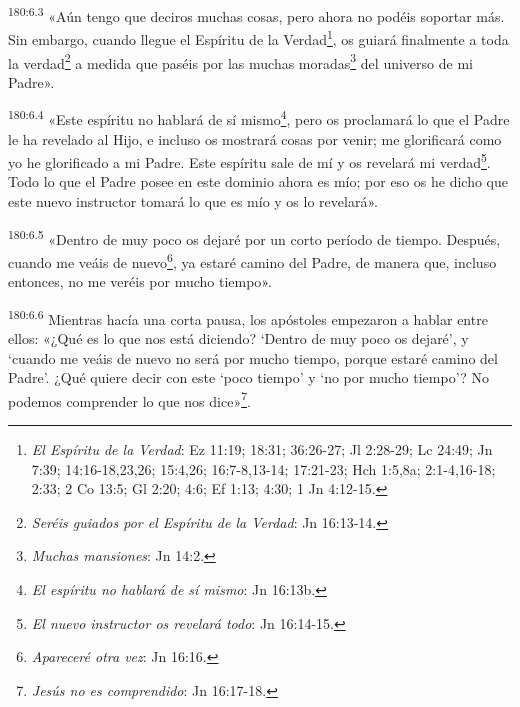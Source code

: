 \par
\textsuperscript{180:6.3} «Aún tengo que deciros muchas cosas, pero ahora no podéis soportar más. Sin embargo, cuando llegue el Espíritu de la Verdad\footnote{\textit{El Espíritu de la Verdad}: Ez 11:19; 18:31; 36:26-27; Jl 2:28-29; Lc 24:49; Jn 7:39; 14:16-18,23,26; 15:4,26; 16:7-8,13-14; 17:21-23; Hch 1:5,8a; 2:1-4,16-18; 2:33; 2 Co 13:5; Gl 2:20; 4:6; Ef 1:13; 4:30; 1 Jn 4:12-15.}, os guiará finalmente a toda la verdad\footnote{\textit{Seréis guiados por el Espíritu de la Verdad}: Jn 16:13-14.} a medida que paséis por las muchas moradas\footnote{\textit{Muchas mansiones}: Jn 14:2.} del universo de mi Padre».

\par
\textsuperscript{180:6.4} «Este espíritu no hablará de sí mismo\footnote{\textit{El espíritu no hablará de sí mismo}: Jn 16:13b.}, pero os proclamará lo que el Padre le ha revelado al Hijo, e incluso os mostrará cosas por venir; me glorificará como yo he glorificado a mi Padre. Este espíritu sale de mí y os revelará mi verdad\footnote{\textit{El nuevo instructor os revelará todo}: Jn 16:14-15.}. Todo lo que el Padre posee en este dominio ahora es mío; por eso os he dicho que este nuevo instructor tomará lo que es mío y os lo revelará».

\par
\textsuperscript{180:6.5} «Dentro de muy poco os dejaré por un corto período de tiempo. Después, cuando me veáis de nuevo\footnote{\textit{Apareceré otra vez}: Jn 16:16.}, ya estaré camino del Padre, de manera que, incluso entonces, no me veréis por mucho tiempo».

\par
\textsuperscript{180:6.6} Mientras hacía una corta pausa, los apóstoles empezaron a hablar entre ellos: «¿Qué es lo que nos está diciendo? `Dentro de muy poco os dejaré', y `cuando me veáis de nuevo no será por mucho tiempo, porque estaré camino del Padre'. ¿Qué quiere decir con este `poco tiempo' y `no por mucho tiempo'? No podemos comprender lo que nos dice»\footnote{\textit{Jesús no es comprendido}: Jn 16:17-18.}.

